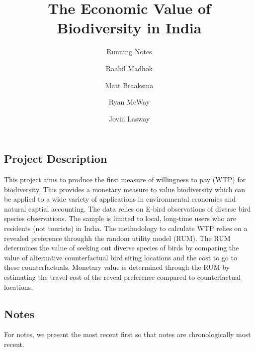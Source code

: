 \documentclass[
  letterpaper,
]{article}
\title{The Economic Value of Biodiversity in India}
\subtitle{Running Notes}
\author{Raahil Madhok \and Matt Braaksma \and Ryan McWay \and Jovin
Lasway}
\date{}
\renewcommand*\contentsname{Table of contents}
\newcommand\contentsname{Table of contents}
\begin{document}
\maketitle

\renewcommand*\contentsname{Table of contents}
{
\hypersetup{linkcolor=}
\setcounter{tocdepth}{3}
\tableofcontents
}

\subsection{Project Description}\label{project-description}

This project aims to produce the first measure of willingness to pay
(WTP) for biodiversity. This provides a monetary measure to value
biodiversity which can be applied to a wide variety of applications in
environmental economics and natural captial accounting. The data relies
on E-bird observations of diverse bird species observations. The sample
is limited to local, long-time users who are residents (not tourists) in
India. The methodology to calculate WTP relies on a revealed preference
throughh the random utility model (RUM). The RUM determines the value of
seeking out diverse species of birds by comparing the value of
alternative counterfactual bird siting locations and the cost to go to
these counterfactuals. Monetary value is determined through the RUM by
estimating the travel cost of the reveal preference compared to
counterfactual locations.

\subsection{Notes}\label{notes}

For notes, we present the most recent first so that notes are
chronologically most recent.
\end{document}
